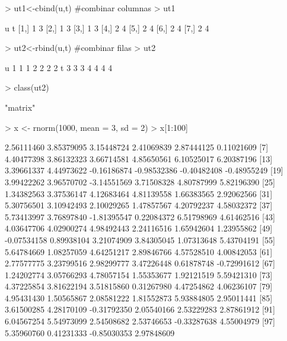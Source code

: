 \documentclass[12pt]{article}
\begin{document}
\begin{Schunk}
\begin{Soutput}
\end{Soutput}
\begin{Sinput}
> ut1<-cbind(u,t) #combinar columnas
> ut1
\end{Sinput}
\begin{Soutput}
     u t
[1,] 1 3
[2,] 1 3
[3,] 1 3
[4,] 2 4
[5,] 2 4
[6,] 2 4
[7,] 2 4
\end{Soutput}
\begin{Sinput}
> ut2<-rbind(u,t) #combinar filas
> ut2
\end{Sinput}
\begin{Soutput}
  [,1] [,2] [,3] [,4] [,5] [,6] [,7]
u    1    1    1    2    2    2    2
t    3    3    3    4    4    4    4
\end{Soutput}
\begin{Sinput}
> class(ut2)
\end{Sinput}
\begin{Soutput}
[1] "matrix"
\end{Soutput}
\begin{Sinput}
> x <- rnorm(1000, mean = 3, sd = 2) 
> x[1:100]
\end{Sinput}
\begin{Soutput}
  [1]  2.56111460  3.85379095  3.15448724  2.41069839  2.87444125  0.11021609
  [7]  4.40477398  3.86132323  3.66714581  4.85650561  6.10525017  6.20387196
 [13]  3.39661337  4.44973622 -0.16186874 -0.98532386 -0.40482408 -0.48955249
 [19]  3.99422262  3.96570702 -3.14551569  3.71508328  4.80787999  5.82196390
 [25]  1.34382563  3.37536147  4.12683464  4.81139558  1.66383565  2.92062566
 [31]  5.30756501  3.10942493  2.10029265  1.47857567  4.20792237  4.58032372
 [37]  5.73413997  3.76897840 -1.81395547  0.22084372  6.51798969  4.61462516
 [43]  4.03647706  4.02900274  4.98492443  2.24116516  1.65942604  1.23955862
 [49] -0.07534158  0.89938104  3.21074909  3.84305045  1.07313648  5.43704191
 [55]  5.64784669  1.08257059  4.64251217  2.89846766  4.57528510  4.00842053
 [61]  2.77577775  3.23799516  2.98299777  3.47226448  0.61878748 -0.72991612
 [67]  1.24202774  3.05766293  4.78057154  1.55353677  1.92121519  5.59421310
 [73]  4.37225854  3.81622194  3.51815860  0.31267980  4.47254862  4.06236107
 [79]  4.95431430  1.50565867  2.08581222  1.81552873  5.93884805  2.95011441
 [85]  3.61500285  4.28170109 -0.31792350  2.05540166  2.53229283  2.87861912
 [91]  6.04567254  5.54973099  2.54508682  2.53746653 -0.33287638  4.55004979
 [97]  5.35960760  0.41231333 -0.85030353  2.97848609
\end{Soutput}
\begin{Sinput}

\end{Sinput}
\end{Schunk}
\end{document}
